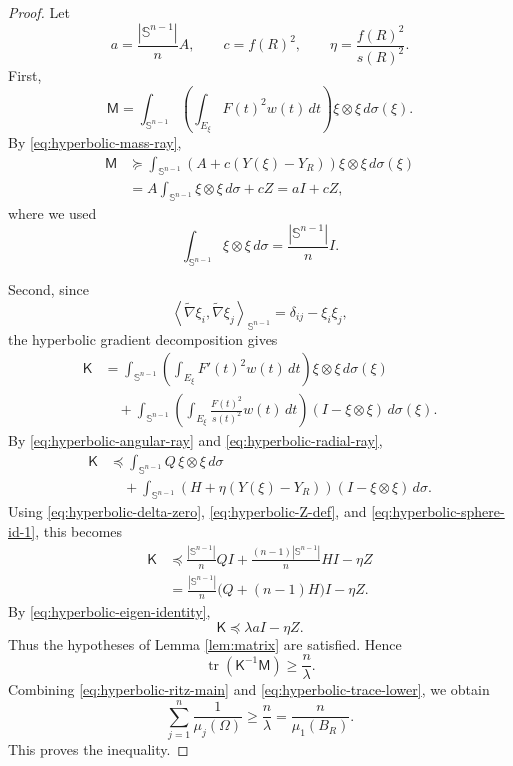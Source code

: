 \documentclass[10pt,a4paper]{amsart}
\DeclareMathOperator{\tr}{tr}
\newcommand{\Sn}{\mathbb S}
\newcommand{\Id}{I}
\newcommand{\mcM}{\mathsf M}
\newcommand{\mcK}{\mathsf K}
\begin{document}
\begin{proof}
Let
\begin{equation}\label{eq:hyperbolic-aceta-def}
        a=\frac{|\Sn^{n-1}|}{n}A,
        \qquad
        c=f(R)^2,
        \qquad
        \eta=\frac{f(R)^2}{s(R)^2}.
\end{equation}
First,
$$
        \mcM
        =\int_{\Sn^{n-1}}
        \left(\int_{E_\xi}F(t)^2w(t)\,dt\right)
        \xi\otimes\xi\,d\sigma(\xi).
$$
By \eqref{eq:hyperbolic-mass-ray},
\begin{align*}
        \mcM
        &\succeq
        \int_{\Sn^{n-1}}
        \left(A+c(Y(\xi)-Y_R)\right)
        \xi\otimes\xi\,d\sigma(\xi)\\
        &=A\int_{\Sn^{n-1}}\xi\otimes\xi\,d\sigma+cZ
        =a\Id+cZ,
\end{align*}
where we used
\begin{equation}\label{eq:hyperbolic-sphere-id-1}
        \int_{\Sn^{n-1}}\xi\otimes\xi\,d\sigma=\frac{|\Sn^{n-1}|}{n}\Id.
\end{equation}

Second, since
$$
        \left\langle \widetilde\nabla \xi_i,\widetilde\nabla\xi_j\right\rangle_{\Sn^{n-1}}
        =\delta_{ij}-\xi_i\xi_j,
$$
the hyperbolic gradient decomposition gives
\begin{align*}
        \mcK
        &=\int_{\Sn^{n-1}}
        \left(\int_{E_\xi}F'(t)^2w(t)\,dt\right)
        \xi\otimes\xi\,d\sigma(\xi)\\
        &\quad+
        \int_{\Sn^{n-1}}
        \left(\int_{E_\xi}\frac{F(t)^2}{s(t)^2}w(t)\,dt\right)
        (\Id-\xi\otimes\xi)\,d\sigma(\xi).
\end{align*}
By \eqref{eq:hyperbolic-angular-ray} and \eqref{eq:hyperbolic-radial-ray},
\begin{align*}
        \mcK
        &\preceq
        \int_{\Sn^{n-1}}Q\,\xi\otimes\xi\,d\sigma\\
        &\quad+
        \int_{\Sn^{n-1}}
        \left(H+\eta(Y(\xi)-Y_R)\right)
        (\Id-\xi\otimes\xi)\,d\sigma.
\end{align*}
Using \eqref{eq:hyperbolic-delta-zero}, \eqref{eq:hyperbolic-Z-def}, and \eqref{eq:hyperbolic-sphere-id-1}, this becomes
\begin{align*}
        \mcK
        &\preceq
        \frac{|\Sn^{n-1}|}{n}Q\Id
        +\frac{(n-1)|\Sn^{n-1}|}{n}H\Id
        -\eta Z\\
        &=\frac{|\Sn^{n-1}|}{n}\bigl(Q+(n-1)H\bigr)\Id-\eta Z.
\end{align*}
By \eqref{eq:hyperbolic-eigen-identity},
\begin{equation}\label{eq:hyperbolic-K-bound-main}
        \mcK\preceq \lambda a\Id-\eta Z.
\end{equation}
Thus the hypotheses of Lemma \ref{lem:matrix} are satisfied.  Hence
\begin{equation}\label{eq:hyperbolic-trace-lower}
        \tr(\mcK^{-1}\mcM)\ge \frac{n}{\lambda}.
\end{equation}
Combining \eqref{eq:hyperbolic-ritz-main} and \eqref{eq:hyperbolic-trace-lower}, we obtain
$$
        \sum_{j=1}^n\frac1{\mu_j(\Omega)}
        \ge \frac{n}{\lambda}
        =\frac{n}{\mu_1(B_R)}.
$$
This proves the inequality.


\end{proof}
\end{document}
